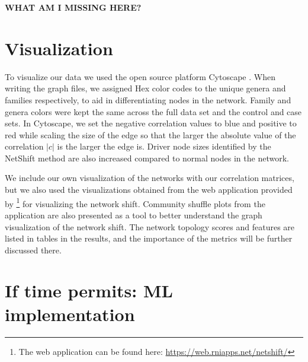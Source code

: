 \textbf{WHAT AM I MISSING HERE?}

\section{Visualization}\label{meth:viz}
To visualize our data we used the open source platform Cytoscape \citep{Shannon2003_cytoscape}. When writing the graph files, we assigned Hex color codes to the unique genera and families respectively, to aid in differentiating nodes in the network. Family and genera colors were kept the same across the full data set and the control and case sets. In Cytoscape, we set the negative correlation values to blue and positive to red while scaling the size of the edge so that the larger the absolute value of the correlation $|c|$ is the larger the edge is. Driver node sizes identified by the NetShift method are also increased compared to normal nodes in the network. 

We include our own visualization of the networks with our correlation matrices, but we also used the visualizations obtained from the web application provided by \citeauthor{Kuntal2018}\footnote{The web application can be found here: \url{https://web.rniapps.net/netshift/}} for visualizing the network shift. Community shuffle plots from the application are also presented as a tool to better understand the graph visualization of the network shift. The network topology scores and features are listed in tables in the results, and the importance of the metrics will be further discussed there. 

\section{If time permits: ML implementation}





